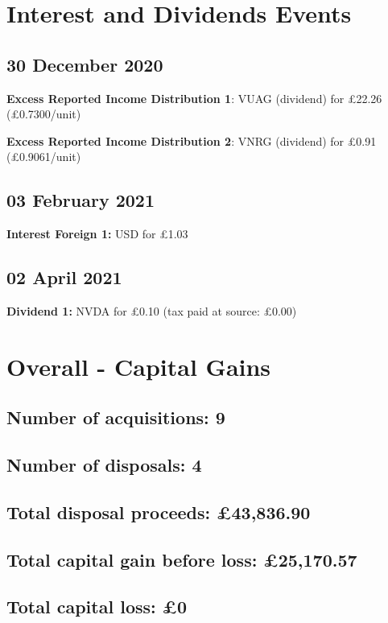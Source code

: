 \documentclass{article}
\begin{document}
\clearpage
\section*{Interest and Dividends Events}


\subsection*{30 December 2020}
\textbf{Excess Reported Income Distribution 1}: VUAG (dividend) for £22.26
(£0.7300/unit)%

\textbf{Excess Reported Income Distribution 2}: VNRG (dividend) for £0.91
(£0.9061/unit)%



\subsection*{03 February 2021}
\textbf{Interest Foreign 1:} USD for £1.03



\subsection*{02 April 2021}
\textbf{Dividend 1:} NVDA for £0.10
(tax paid at source: £0.00)



\clearpage
\section*{Overall - Capital Gains}
\subsection*{Number of acquisitions: 9}
\subsection*{Number of disposals: 4}
\subsection*{Total disposal proceeds: £43,836.90}
\subsection*{Total capital gain before loss: £25,170.57}
\subsection*{Total capital loss: £0}
\end{document}
